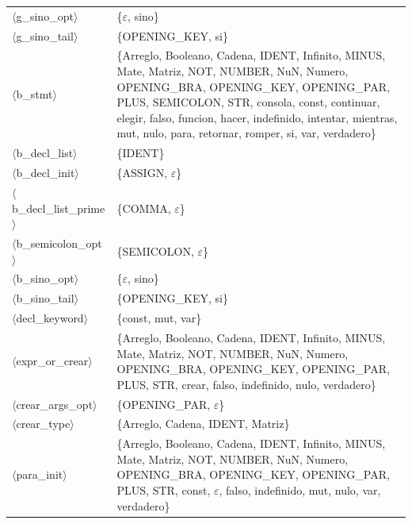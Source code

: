 \documentclass[10pt]{article}
\begin{document}
{\begin{longtable}{@{} p{3.5cm} p{13cm} @{}}
  \parbox[t]{3.3cm}{\raggedright$\langle$g\_\allowbreak{}sino\_\allowbreak{}opt$\rangle$} & \{$\varepsilon$, sino\} \\
  \parbox[t]{3.3cm}{\raggedright$\langle$g\_\allowbreak{}sino\_\allowbreak{}tail$\rangle$} & \{OPENING\_KEY, si\} \\
  \parbox[t]{3.3cm}{\raggedright$\langle$b\_\allowbreak{}stmt$\rangle$} & \{Arreglo, Booleano, Cadena, IDENT, Infinito, MINUS, Mate, Matriz, NOT, NUMBER, NuN, Numero, OPENING\_BRA, OPENING\_KEY, OPENING\_PAR, PLUS, SEMICOLON, STR, consola, const, continuar, elegir, falso, funcion, hacer, indefinido, intentar, mientras, mut, nulo, para, retornar, romper, si, var, verdadero\} \\
  \parbox[t]{3.3cm}{\raggedright$\langle$b\_\allowbreak{}decl\_\allowbreak{}list$\rangle$} & \{IDENT\} \\
  \parbox[t]{3.3cm}{\raggedright$\langle$b\_\allowbreak{}decl\_\allowbreak{}init$\rangle$} & \{ASSIGN, $\varepsilon$\} \\
  \parbox[t]{3.3cm}{\raggedright$\langle$b\_\allowbreak{}decl\_\allowbreak{}list\_\allowbreak{}prime$\rangle$} & \{COMMA, $\varepsilon$\} \\
  \parbox[t]{3.3cm}{\raggedright$\langle$b\_\allowbreak{}semicolon\_\allowbreak{}opt$\rangle$} & \{SEMICOLON, $\varepsilon$\} \\
  \parbox[t]{3.3cm}{\raggedright$\langle$b\_\allowbreak{}sino\_\allowbreak{}opt$\rangle$} & \{$\varepsilon$, sino\} \\
  \parbox[t]{3.3cm}{\raggedright$\langle$b\_\allowbreak{}sino\_\allowbreak{}tail$\rangle$} & \{OPENING\_KEY, si\} \\
  \parbox[t]{3.3cm}{\raggedright$\langle$decl\_\allowbreak{}keyword$\rangle$} & \{const, mut, var\} \\
  \parbox[t]{3.3cm}{\raggedright$\langle$expr\_\allowbreak{}or\_\allowbreak{}crear$\rangle$} & \{Arreglo, Booleano, Cadena, IDENT, Infinito, MINUS, Mate, Matriz, NOT, NUMBER, NuN, Numero, OPENING\_BRA, OPENING\_KEY, OPENING\_PAR, PLUS, STR, crear, falso, indefinido, nulo, verdadero\} \\
  \parbox[t]{3.3cm}{\raggedright$\langle$crear\_\allowbreak{}args\_\allowbreak{}opt$\rangle$} & \{OPENING\_PAR, $\varepsilon$\} \\
  \parbox[t]{3.3cm}{\raggedright$\langle$crear\_\allowbreak{}type$\rangle$} & \{Arreglo, Cadena, IDENT, Matriz\} \\
  \parbox[t]{3.3cm}{\raggedright$\langle$para\_\allowbreak{}init$\rangle$} & \{Arreglo, Booleano, Cadena, IDENT, Infinito, MINUS, Mate, Matriz, NOT, NUMBER, NuN, Numero, OPENING\_BRA, OPENING\_KEY, OPENING\_PAR, PLUS, STR, const, $\varepsilon$, falso, indefinido, mut, nulo, var, verdadero\} \\

\end{longtable}}
\end{document}
